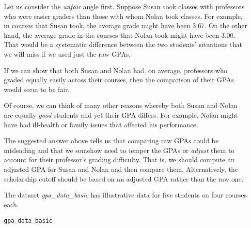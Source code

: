 \documentclass[
  12pt,
  letterpaper,
  DIV=11,
  numbers=noendperiod]{scrreprt}
\begin{document}
\begin{tcolorbox}[enhanced jigsaw, colback=white, leftrule=.75mm, toprule=.15mm, bottomtitle=1mm, breakable, coltitle=black, toptitle=1mm, title={Suggested answer}, opacitybacktitle=0.6, colbacktitle=quarto-callout-note-color!10!white, arc=.35mm, left=2mm, colframe=quarto-callout-note-color-frame, titlerule=0mm, rightrule=.15mm, bottomrule=.15mm, opacityback=0]

Let us consider the \emph{unfair} angle first. Suppose Susan took
classes with professors who were easier graders than those with whom
Nolan took classes. For example, in courses that Susan took, the average
grade might have been 3.67. On the other hand, the average grade in the
courses that Nolan took might have been 3.00. That would be a systematic
difference between the two students' situations that we will miss if we
used just the raw GPAs.

If we can show that both Susan and Nolan had, on average, professors who
graded equally easily across their courses, then the comparison of their
GPAs would seem to be fair.

Of course, we can think of many other reasons whereby both Susan and
Nolan are equally \emph{good} students and yet their GPA differs. For
example, Nolan might have had ill-health or family issues that affected
his performance.

\end{tcolorbox}

The suggested answer above tells us that comparing raw GPAs could be
misleading and that we somehow need to temper the GPAs or \emph{adjust}
them to account for their professor's grading difficulty. That is, we
should compute an adjusted GPA for Susan and Nolan and then compare
them. Alternatively, the scholarship cutoff should be based on an
adjusted GPA rather than the raw one.

The dataset \emph{gpa\_data\_basic} has illustrative data for five
students on four courses each.

\begin{lstlisting}[language=R]
gpa_data_basic
\end{lstlisting}
\end{document}
